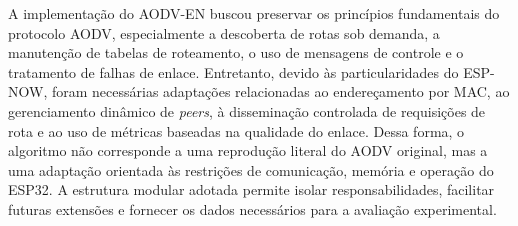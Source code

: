A implementação do AODV-EN buscou preservar os princípios fundamentais do
protocolo AODV, especialmente a descoberta de rotas sob demanda, a
manutenção de tabelas de roteamento, o uso de mensagens de controle e o
tratamento de falhas de enlace. Entretanto, devido às particularidades
do ESP-NOW, foram necessárias adaptações relacionadas ao endereçamento
por MAC, ao gerenciamento dinâmico de \emph{peers}, à disseminação controlada
de requisições de rota e ao uso de métricas baseadas na qualidade do
enlace. Dessa forma, o algoritmo não corresponde a uma reprodução
literal do AODV original, mas a uma adaptação orientada às restrições de
comunicação, memória e operação do ESP32. A estrutura modular adotada
permite isolar responsabilidades, facilitar futuras extensões e fornecer
os dados necessários para a avaliação experimental.
